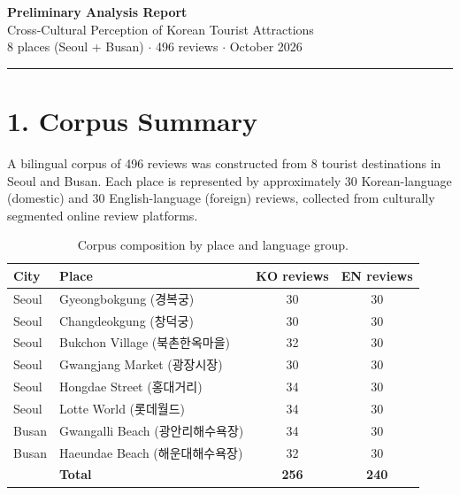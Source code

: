 \documentclass[11pt,a4paper]{article}
\begin{document}
\begin{center}
{\Large\textbf{Preliminary Analysis Report}}\\[6pt]
{\large Cross-Cultural Perception of Korean Tourist Attractions}\\[4pt]
{\normalsize 8 places (Seoul + Busan) $\cdot$ 496 reviews $\cdot$ October 2026}
\end{center}

\vspace{8pt}
\noindent\rule{\linewidth}{0.4pt}

\section*{1. Corpus Summary}

A bilingual corpus of 496 reviews was constructed from 8 tourist destinations
in Seoul and Busan. Each place is represented by approximately 30 Korean-language
(domestic) and 30 English-language (foreign) reviews, collected from
culturally segmented online review platforms.

\begin{table}[H]
\centering
\small
\begin{tabular}{llcc}
\toprule
\textbf{City} & \textbf{Place} & \textbf{KO reviews} & \textbf{EN reviews} \\
\midrule
Seoul  & Gyeongbokgung (경복궁)         & 30 & 30 \\
Seoul  & Changdeokgung (창덕궁)         & 30 & 30 \\
Seoul  & Bukchon Village (북촌한옥마을)   & 32 & 30 \\
Seoul  & Gwangjang Market (광장시장)     & 30 & 30 \\
Seoul  & Hongdae Street (홍대거리)       & 34 & 30 \\
Seoul  & Lotte World (롯데월드)          & 34 & 30 \\
Busan  & Gwangalli Beach (광안리해수욕장) & 34 & 30 \\
Busan  & Haeundae Beach (해운대해수욕장)  & 32 & 30 \\
\midrule
       & \textbf{Total}                 & \textbf{256} & \textbf{240} \\
\bottomrule
\end{tabular}
\caption{Corpus composition by place and language group.}
\end{table}

\end{document}

